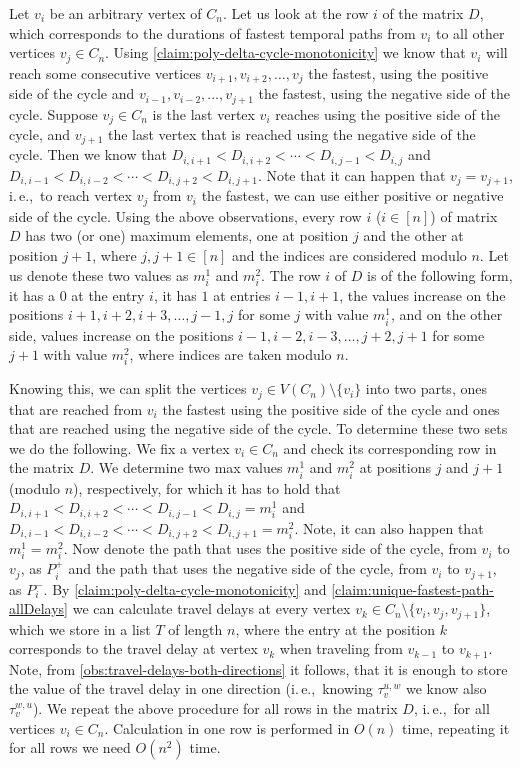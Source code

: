 \documentclass[11pt,a4paper]{article}
\theoremstyle{remark}
\theoremstyle{definition}
\newcommand{\ie}{i.\,e.,\ }
\begin{document}
Let $v_i$ be an arbitrary vertex of $C_n$. Let us look at the row $i$ of the matrix $D$, which corresponds to the durations of fastest temporal paths from $v_i$ to all other vertices $v_j \in C_n$.
Using \cref{claim:poly-delta-cycle-monotonicity} we know that $v_i$ will reach some consecutive vertices $v_{i+1}, v_{i+2}, \dots, v_j$ the fastest, using the positive side of the cycle 
and $v_{i-1}, v_{i-2}, \dots, v_{j+1}$ the fastest, using the negative side of the cycle.
Suppose $v_j \in C_n$ is the last vertex $v_i$ reaches using the positive side of the cycle, and $v_{j+1}$ the last vertex that is reached using the negative side of the cycle.
Then we know that $D_{i,i+1} < D_{i,i+2} < \cdots< D_{i,j-1} < D_{i,j}$ and 
$D_{i,i-1} < D_{i,i-2} < \cdots < D_{i,j+2} < D_{i,j+1}$.
Note that it can happen that $v_j = v_{j+1}$, \ie to reach vertex $v_j$ from $v_i$ the fastest, we can use either positive or negative side of the cycle.
Using the above observations, every row $i$ ($i \in [n]$) of matrix $D$ has two (or one) maximum elements, one at position $j$ and the other at position $j+1$, where $j, j+1 \in [n]$ and the indices are considered modulo $n$.
Let us denote these two values as $m_i^1$ and $m_i^2$.
The row $i$ of $D$ is of the following form, it has a $0$ at the entry $i$, it has $1$ at entries $i-1, i+1$,
the values increase on the positions $i+1, i+2, i+3, \dots, j-1, j$ for some $j$ with value $m_i^1$, 
and on the other side, values increase on the positions $i-1, i-2, i-3, \dots, j+2, j+1$ for some $j+1$ with value $m_i^2$,
where indices are taken modulo $n$.

Knowing this, we can split the vertices $v_j \in V(C_n) \setminus \{v_i\}$ into two parts, ones that are reached from $v_i$ the fastest using the positive side of the cycle and ones that are reached using the negative side of the cycle.
To determine these two sets we do the following.
We fix a vertex $v_i \in C_n$ and check its corresponding row in the matrix $D$. 
We determine two max values $m_i^1$ and $m_i^2$ at positions $j$ and $j+1$ (modulo $n$), respectively,
for which it has to hold that
$D_{i,i+1} < D_{i,i+2} < \cdots< D_{i,j-1} < D_{i,j}=m_i^1$ and 
$D_{i,i-1} < D_{i,i-2} < \cdots < D_{i,j+2} < D_{i,j+1}=m_i^2$.
Note, it can also happen that $m_i^1 = m_i^2$. 
Now denote the path that uses the positive side of the cycle, from $v_i$ to $v_j$, as $P^+_i$ and
the path that uses the negative side of the cycle, from $v_i$ to $v_{j+1}$, as $P^-_i$.
By \cref{claim:poly-delta-cycle-monotonicity} and \cref{claim:unique-fastest-path-allDelays} we can calculate travel delays at every vertex $v_k \in C_n \setminus \{v_i, v_j, v_{j+1}\}$,
which we store in a list $T$ of length $n$,
where the entry at the position $k$ corresponds to the travel delay at vertex $v_k$ when traveling from $v_{k-1}$ to $v_{k+1}$.
Note, from \cref{obs:travel-delays-both-directions} it follows, that it is enough to store the value of the travel delay in one direction (\ie knowing $\tau_v^{u,w}$ we know also $\tau_v^{w,u}$).
We repeat the above procedure for all rows in the matrix $D$, \ie for all vertices $v_i \in C_n$.
Calculation in one row is performed in $O(n)$ time, repeating it for all rows we need $O(n^2)$ time.
\end{document}
